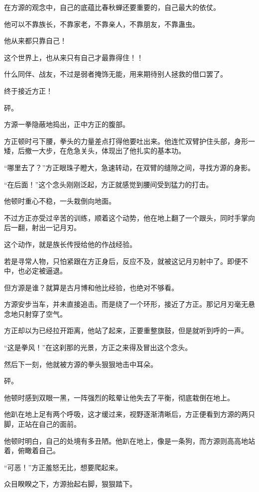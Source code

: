 \begin{this_body}
在方源的观念中，自己的底蕴比春秋蝉还要重要的，自己最大的依仗。

他可以不靠族长，不靠家老，不靠亲人，不靠朋友，不靠蛊虫。

他从来都只靠自己！

这个世界上，也从来只有自己才最靠得住！！

什么同伴、战友，不过是弱者掩饰无能，用来期待别人拯救的借口罢了。

终于接近方正！

砰。

方源一拳隐蔽地捣出，正中方正的腹部。

方正顿时弓下腰，拳头的力量差点打得他要吐出来。他连忙双臂护住头部，身形一矮，后撤一大步，在危急关头，体现出了他扎实的基本功。

“哪里去了？”方正眼珠子瞪大，急速转动，在双臂的缝隙之间，寻找方源的身影。

“在后面！”这个念头刚刚泛起，方正就感觉到腰间受到猛力的打击。

他顿时重心不稳，一头栽倒向地面。

不过方正亦受过辛苦的训练，顺着这个动势，他在地上翻了一个跟头，同时手掌向后一翻，射出一记月刃。

这个动作，就是族长传授给他的作战经验。

若是寻常人物，只怕紧跟在方正身后，反应不及，就被这记月刃射中了。即便不中，也必定被逼退。

但方源是谁？就算是古月博和他比经验，也绝对不够看。

方源安步当车，并未直接追击。而是绕了一个环形，接近了方正。那记月刃毫无悬念地只射穿了空气。

方正却以为已经拉开距离，他站了起来，正要重整旗鼓，但是就听到呼的一声。

“这是拳风！”在这刹那的光景，方正之来得及冒出这个念头。

然后下一刻，他就被方源的拳头狠狠地击中耳朵。

砰。

他顿时感到双眼一黑，一阵强烈的眩晕让他失去了平衡，彻底栽倒在地上。

他趴在地上足有两个呼吸，这才缓过来，视野逐渐清晰后，方正便看到方源的两只脚，正站在自己的面前。

他顿时明白，自己的处境有多丑陋。他趴在地上，像是一条狗，而方源则高高地站着，俯瞰着自己。

“可恶！”方正羞怒无比，想要爬起来。

众目睽睽之下，方源抬起右脚，狠狠踏下。


\end{this_body}
